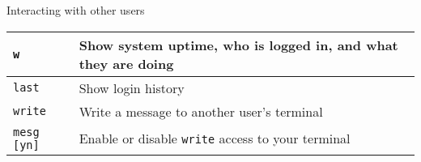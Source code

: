 \begin{block}{Interacting with other users}
  \begin{tabu} to 0.9\linewidth { X X[4] }
    \texttt{w} & Show system uptime, who is logged in, and what they are doing \\ \hline
    \texttt{last} & Show login history \\ \hline
    \texttt{write} & Write a message to another user's terminal \\ \hline
    \texttt{mesg [yn]} & Enable or disable \texttt{write} access to your terminal
  \end{tabu}
\end{block}
